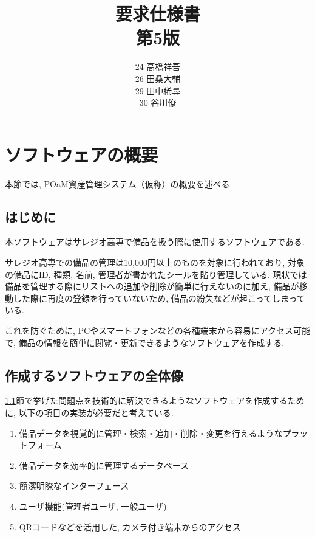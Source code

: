 \documentclass[11ptm]{jsarticle}
\title{{\Huge 要求仕様書}\\第5版}
\author{24 高橋祥吾\\26 田桑大輔\\29 田中稀尋\\30 谷川僚}
\date{}
\begin{document}
\setcounter{page}{0}

\maketitle
\thispagestyle{empty}

\clearpage

\setcounter{page}{0}
\thispagestyle{empty}

\tableofcontents
\clearpage


\section{ソフトウェアの概要}
\label{sec:ソフトウェアの概要}
本節では, POaM資産管理システム（仮称）の概要を述べる.

\subsection{はじめに}
\label{subsec:はじめに}
本ソフトウェアはサレジオ高専で備品を扱う際に使用するソフトウェアである. \par
サレジオ高専での備品の管理は10,000円以上のものを対象に行われており, 対象の備品にID, 種類, 名前, 管理者が書かれたシールを貼り管理している. 現状では備品を管理する際にリストへの追加や削除が簡単に行えないのに加え, 備品が移動した際に再度の登録を行っていないため, 備品の紛失などが起こってしまっている.\par
これを防ぐために, PCやスマートフォンなどの各種端末から容易にアクセス可能で, 備品の情報を簡単に閲覧・更新できるようなソフトウェアを作成する.

\subsection{作成するソフトウェアの全体像}
\label{subsec:作成するソフトウェアの全体像}
\ref{subsec:はじめに}節で挙げた問題点を技術的に解決できるようなソフトウェアを作成するために, 以下の項目の実装が必要だと考えている.
\begin{enumerate}
  \item 備品データを視覚的に管理・検索・追加・削除・変更を行えるようなプラットフォーム
  \item 備品データを効率的に管理するデータベース
  \item 簡潔明瞭なインターフェース
  \item ユーザ機能(管理者ユーザ, 一般ユーザ)
  \item QRコードなどを活用した, カメラ付き端末からのアクセス
\end{enumerate}
\end{document}
